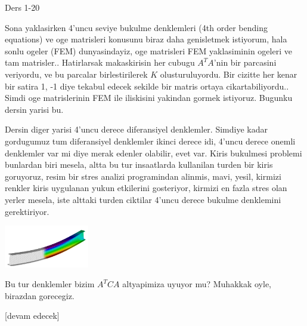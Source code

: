 \documentclass[12pt,fleqn]{article}\usepackage{../../common}
\begin{document}
Ders 1-20

Sona yaklasirken 4'uncu seviye bukulme denklemleri (4th order bending equations)
ve oge matrisleri konusunu biraz daha genisletmek istiyorum, hala sonlu ogeler
(FEM) dunyasindayiz, oge matrisleri FEM yaklasiminin ogeleri ve tam
matrisler.. Hatirlarsak makaskirisin her cubugu $A^T A$'nin bir parcasini
veriyordu, ve bu parcalar birlestirilerek $K$ olusturuluyordu. Bir cizitte her
kenar bir satira 1, -1 diye tekabul edecek sekilde bir matris ortaya
cikartabiliyordu.. Simdi oge matrislerinin FEM ile iliskisini yakindan gormek
istiyoruz. Bugunku dersin yarisi bu.

Dersin diger yarisi 4'uncu derece diferansiyel denklemler. Simdiye kadar
gordugumuz tum diferansiyel denklemler ikinci derece idi, 4'uncu derece onemli
denklemler var mi diye merak edenler olabilir, evet var. Kiris bukulmesi
problemi bunlardan biri mesela, altta bu tur insaatlarda kullanilan turden bir
kiris goruyoruz, resim bir stres analizi programindan alinmis, mavi, yesil,
kirmizi renkler kiris uygulanan yukun etkilerini gosteriyor, kirmizi en fazla
stres olan yerler mesela, iste alttaki turden ciktilar 4'uncu derece bukulme
denklemini gerektiriyor.

\includegraphics[width=10em]{compscieng_1_20_01.png}

Bu tur denklemler bizim $A^T C A$ altyapimiza uyuyor mu? Muhakkak oyle,
birazdan gorecegiz. 























[devam edecek]
\end{document}
